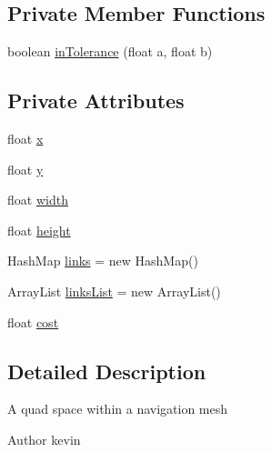 \subsection*{Private Member Functions}
\begin{DoxyCompactItemize}
\item 
boolean \mbox{\hyperlink{classorg_1_1newdawn_1_1slick_1_1util_1_1pathfinding_1_1navmesh_1_1_space_ab9726ac8b79e58055a8a2199477cffd7}{in\+Tolerance}} (float a, float b)
\end{DoxyCompactItemize}
\subsection*{Private Attributes}
\begin{DoxyCompactItemize}
\item 
float \mbox{\hyperlink{classorg_1_1newdawn_1_1slick_1_1util_1_1pathfinding_1_1navmesh_1_1_space_a314d8d0ed7351fbaaa0a191464e26bfc}{x}}
\item 
float \mbox{\hyperlink{classorg_1_1newdawn_1_1slick_1_1util_1_1pathfinding_1_1navmesh_1_1_space_ad394b749482835dc1430efff0321010e}{y}}
\item 
float \mbox{\hyperlink{classorg_1_1newdawn_1_1slick_1_1util_1_1pathfinding_1_1navmesh_1_1_space_a503d0a0778ebcb12877f5c432aa97698}{width}}
\item 
float \mbox{\hyperlink{classorg_1_1newdawn_1_1slick_1_1util_1_1pathfinding_1_1navmesh_1_1_space_a2214b5226eed20766ff61fc3f9803a58}{height}}
\item 
Hash\+Map \mbox{\hyperlink{classorg_1_1newdawn_1_1slick_1_1util_1_1pathfinding_1_1navmesh_1_1_space_aa9edbad1ad11ced12f9a5a5b73b50a9f}{links}} = new Hash\+Map()
\item 
Array\+List \mbox{\hyperlink{classorg_1_1newdawn_1_1slick_1_1util_1_1pathfinding_1_1navmesh_1_1_space_ab8ed6f02eb154ea33c907a3dda0b92db}{links\+List}} = new Array\+List()
\item 
float \mbox{\hyperlink{classorg_1_1newdawn_1_1slick_1_1util_1_1pathfinding_1_1navmesh_1_1_space_a9807ff26ac70231463426ebbaf4b8dac}{cost}}
\end{DoxyCompactItemize}


\subsection{Detailed Description}
A quad space within a navigation mesh

\begin{DoxyAuthor}{Author}
kevin 
\end{DoxyAuthor}


